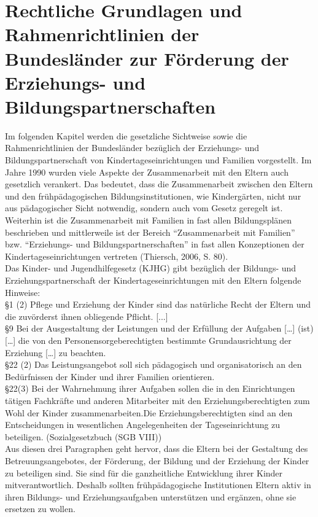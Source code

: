 \documentclass[12pt,a4paper]{article}
\begin{document}
\section{Rechtliche Grundlagen und Rahmenrichtlinien der Bundesländer zur Förderung der Erziehungs- und Bildungspartnerschaften}
Im folgenden Kapitel werden die gesetzliche Sichtweise sowie die Rahmenrichtlinien der Bundesländer bezüglich der Erziehungs- und Bildungspartnerschaft von Kindertageseinrichtungen und Familien vorgestellt.
Im Jahre 1990 wurden viele Aspekte der Zusammenarbeit mit den Eltern auch gesetzlich verankert. Das bedeutet, dass die Zusammenarbeit zwischen den Eltern und den frühpädagogischen Bildungsinstitutionen, wie Kindergärten, nicht nur aus pädagogischer Sicht notwendig, sondern auch vom Gesetz geregelt ist. Weiterhin ist die Zusammenarbeit mit Familien in fast allen Bildungsplänen beschrieben und mittlerweile ist der Bereich "`Zusammenarbeit mit Familien"' bzw. "`Erziehungs- und Bildungspartnerschaften"' in fast allen Konzeptionen der Kindertageseinrichtungen vertreten (Thiersch, 2006, S. 80).\\
	Das Kinder- und Jugendhilfegesetz (KJHG) gibt bezüglich der Bildungs- und Erziehungspartnerschaft der Kindertageseinrichtungen mit den Eltern folgende Hinweise:\\
	\noindent\hspace*{15mm}%
 §1 (2) Pflege und Erziehung der Kinder sind das natürliche Recht
der Eltern und die zuvörderst ihnen obliegende Pflicht. [...]\\
 \noindent\hspace*{15mm}%
 §9 Bei der Ausgestaltung der Leistungen und der Erfüllung der Aufgaben […]  (ist)  […] die von den Personensorgeberechtigten bestimmte 
Grundausrichtung der  Erziehung […] zu beachten.\\
 \noindent\hspace*{15mm}%
§22 (2) Das Leistungsangebot soll sich pädagogisch und organisatorisch an den Bedürfnissen der Kinder und ihrer Familien orientieren.\\
\noindent\hspace*{15mm}%
 §22(3) Bei der Wahrnehmung ihrer Aufgaben sollen die in den Einrichtungen tätigen Fachkräfte und anderen Mitarbeiter mit den Erziehungsberechtigten zum Wohl der Kinder zusammenarbeiten.Die Erziehungsberechtigten sind an den 	Entscheidungen in wesentlichen Angelegenheiten der Tageseinrichtung zu beteiligen. (Sozialgesetzbuch (SGB VIII))\\
Aus diesen drei Paragraphen geht hervor, dass die Eltern bei der Gestaltung des Betreuungsangebotes, der Förderung, der Bildung und der Erziehung der Kinder zu beteiligen sind. Sie sind für die ganzheitliche Entwicklung ihrer Kinder mitverantwortlich. Deshalb sollten frühpädagogische Institutionen Eltern aktiv in ihren Bildungs- und Erziehungsaufgaben unterstützen und ergänzen, ohne sie ersetzen zu wollen.
\end{document}
